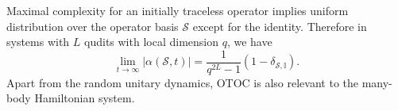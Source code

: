 \documentclass[aps,prb,superscriptaddress,nofootinbib]{revtex4}
\begin{document}
Maximal complexity for an initially traceless operator implies uniform distribution over the operator basis $\mathcal{S}$ except for the identity. 
Therefore in systems with $L$ qudits with local dimension $q$, we have
\begin{equation}
	\lim _{t \rightarrow \infty}|\alpha(\mathcal{S}, t)|=\frac{1}{q^{2 L}-1}\left(1-\delta_{\mathcal{S}, \mathbb I}\right).
\end{equation}
Apart from the random unitary dynamics, OTOC is also relevant to the many-body Hamiltonian system.
\end{document}

